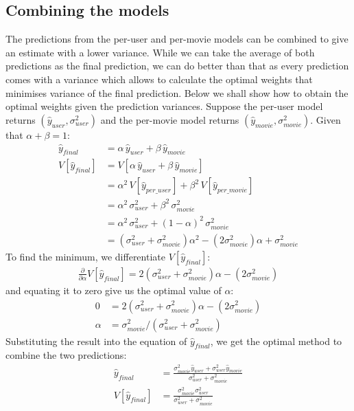 \documentclass[letterpaper]{article}
\begin{document}
\subsection{Combining the models}
The predictions from the per-user and per-movie models can be combined to give an estimate with a lower variance.
While we can take the average of both predictions as the final prediction, we can do better than that as every prediction comes with a variance which allows to calculate the optimal weights that minimises variance of the final prediction. Below we shall show how to obtain the optimal weights given the prediction variances. Suppose the per-user model returns $(\widehat{y}_{user}, \sigma^{2}_{user})$ and the per-movie model returns $(\widehat{y}_{movie},\sigma^{2}_{movie})$. Given that $\alpha + \beta = 1$:
\begin{align*}
	 \widehat{y}_{final} &= \alpha\,\widehat{y}_{user} + \beta\,\widehat{y}_{movie} \\
	 V[\widehat{y}_{final}] &= V[\alpha\,\widehat{y}_{user} + \beta\,\widehat{y}_{movie}]\\
	&= \alpha^{2}\,V[\widehat{y}_{per\_user}] + \beta^{2}\,V[\widehat{y}_{per\_movie}] \\
	&= \alpha^{2}\,\sigma^{2}_{user} + \beta^{2}\,\sigma^{2}_{movie}\\
	&= \alpha^{2}\,\sigma^{2}_{user} + (1-\alpha)^{2}\,\sigma^{2}_{movie}\\
	&= (\sigma^{2}_{user}+\sigma^{2}_{movie})\alpha^{2}-(2\sigma^{2}_{movie})\alpha+\sigma^{2}_{movie}
\end{align*}
To find the minimum, we differentiate $V[\widehat{y}_{final}]$:
\begin{align*}
\frac{\partial}{\partial\alpha}V[\widehat{y}_{final}] = 2(\sigma^{2}_{user}+\sigma^{2}_{movie})\alpha-(2\sigma^{2}_{movie})
\end{align*}
and equating it to zero give us the optimal value of $\alpha$:
\begin{align*}
0&=2(\sigma^{2}_{user}+\sigma^{2}_{movie})\alpha-(2\sigma^{2}_{movie})\\
\alpha&=\sigma^{2}_{movie}/(\sigma^{2}_{user}+\sigma^{2}_{movie})
\end{align*}
Substituting the result into the equation of $\widehat{y}_{final}$, we get the optimal method to combine the two predictions:
\begin{align*}
\widehat{y}_{final} &=\frac{\sigma^{2}_{movie}\widehat{y}_{user} + \sigma^{2}_{user}\widehat{y}_{movie}}{\sigma^{2}_{user}+\sigma^{2}_{movie}}\\
V[\widehat{y}_{final}]&=\frac{\sigma^{2}_{movie}\sigma^{2}_{user}}{\sigma^{2}_{user}+\sigma^{2}_{movie}}
\end{align*}
\end{document}
